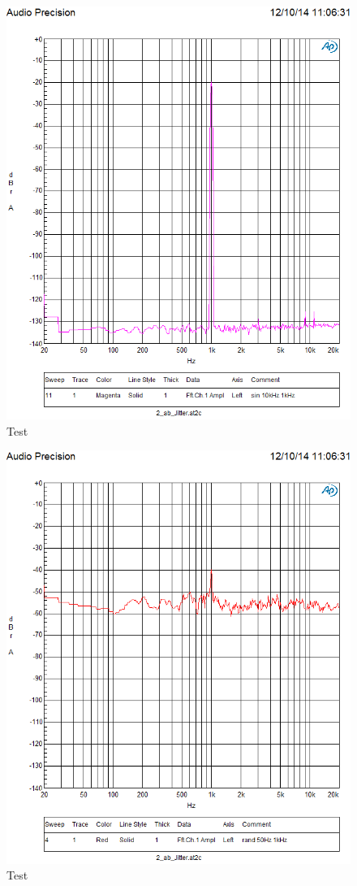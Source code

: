 \begin{figure}[h!]
\centering
\includegraphics[width=\columnwidth]{figures/Aufg2/11.PNG} 
\caption{Test}
\end{figure}


\begin{figure}[h!]
\centering
\includegraphics[width=\columnwidth]{figures/Aufg2/4.PNG} 
\caption{Test}
\end{figure}
\clearpage

